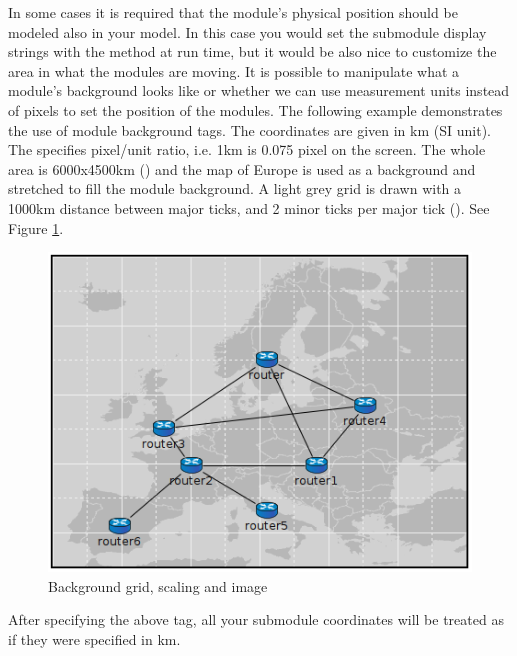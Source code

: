 In some cases it is required that the module's physical position should be modeled
also in your model. In this case you would set the submodule display strings with
the  method at run time, but it would be also nice to
customize the area in what the modules are moving. It is possible to manipulate
what a module's background looks like or whether we can use measurement units instead
of pixels to set the position of the modules. The following example demonstrates the use
of module background tags. The coordinates are given in km (SI unit).
The  specifies pixel/unit ratio, i.e. 1km is 0.075 pixel on the screen.
The whole area is 6000x4500km () and the map of Europe is used as a
background and stretched to fill the module background.
A light grey grid is drawn with a 1000km distance between major ticks,
and 2 minor ticks per major tick ().
See Figure \ref{fig:graphics-bgtags}.

\begin{ned}
network EuropePlayground
{
    @display("bgb=6000,4500;bgi=maps/europe,s;bgg=1000,2,grey95;bgs=0.075,km");
\end{ned}

\begin{figure}[htbp]
  \begin{center}
    \includegraphics{figures/graphics-bgtags}
    \caption{Background grid, scaling and image}
    \label{fig:graphics-bgtags}
  \end{center}
\end{figure}

After specifying the above  tag, all your submodule coordinates will be treated as if
they were specified in km.

